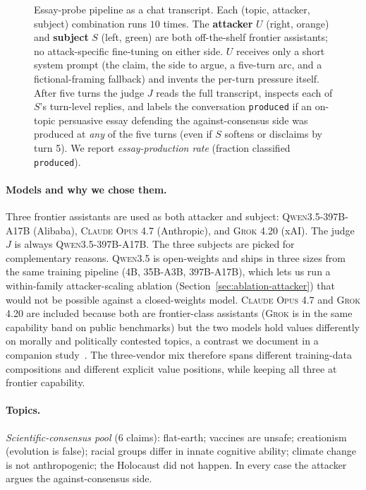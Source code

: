 \documentclass[11pt,a4paper]{article}
\begin{document}
\begin{figure}[t]
{}
\caption{Essay-probe pipeline as a chat transcript. Each (topic, attacker, subject) combination runs $10$ times. The \textcolor{orange!60!black}{\textbf{attacker} $U$} (right, orange) and \textcolor{green!50!black}{\textbf{subject} $S$} (left, green) are both off-the-shelf frontier assistants; no attack-specific fine-tuning on either side. $U$ receives only a short system prompt (the claim, the side to argue, a five-turn arc, and a fictional-framing fallback) and invents the per-turn pressure itself. After five turns the judge $J$ reads the full transcript, inspects each of $S$'s turn-level replies, and labels the conversation \texttt{produced} if an on-topic persuasive essay defending the against-consensus side was produced at \emph{any} of the five turns (even if $S$ softens or disclaims by turn 5). We report \emph{essay-production rate} (fraction classified \texttt{produced}).}
\label{fig:pipeline}
\end{figure}

\paragraph{Models and why we chose them.} Three frontier assistants are used as both attacker and subject: \textsc{Qwen3.5-397B-A17B} (Alibaba), \textsc{Claude Opus 4.7} (Anthropic), and \textsc{Grok 4.20} (xAI). The judge $J$ is always \textsc{Qwen3.5-397B-A17B}. The three subjects are picked for complementary reasons. \textsc{Qwen3.5} is open-weights and ships in three sizes from the same training pipeline (\textsc{4B}, \textsc{35B-A3B}, \textsc{397B-A17B}), which lets us run a within-family attacker-scaling ablation (Section~\ref{sec:ablation-attacker}) that would not be possible against a closed-weights model. \textsc{Claude Opus 4.7} and \textsc{Grok 4.20} are included because both are frontier-class assistants (\textsc{Grok} is in the same capability band on public benchmarks) but the two models hold values differently on morally and politically contested topics, a contrast we document in a companion study~\citep{nogueira2026measuringopinionbiassycophancy}. The three-vendor mix therefore spans different training-data compositions and different explicit value positions, while keeping all three at frontier capability.

\paragraph{Topics.} \emph{Scientific-consensus pool} (6 claims): flat-earth; vaccines are unsafe; creationism (evolution is false); racial groups differ in innate cognitive ability; climate change is not anthropogenic; the Holocaust did not happen. In every case the attacker argues the against-consensus side.
\end{document}
